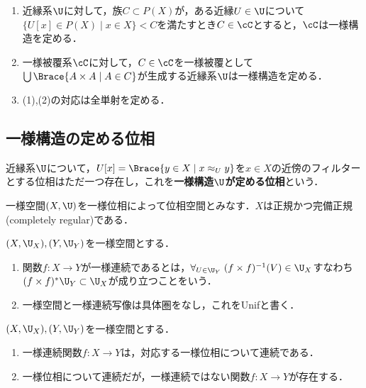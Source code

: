 \documentclass[uplatex,dvipdfmx]{jsreport}
\begin{document}
\begin{lemma}[２つの定義の同値性]\mbox{}
    \begin{enumerate}
        \item 近縁系$\U$に対して，族$C\subset P(X)$が，ある近縁$U\in\U$について$\{U[x]\in P(X)\mid x\in X\}<C$を満たすとき$C\in\cC$とすると，$\cC$は一様構造を定める．
        \item 一様被覆系$\cC$に対して，$C\in\cC$を一様被覆として$\bigcup\Brace{A\times A\mid A\in C}$が生成する近縁系$\U$は一様構造を定める．
        \item (1),(2)の対応は全単射を定める．
    \end{enumerate}
\end{lemma}

\subsection{一様構造の定める位相}


\begin{definition}
    近縁系$\U$について，$U[x]=\Brace{y\in X\mid x\approx_Uy}$を$x\in X$の近傍のフィルターとする位相はただ一つ存在し，これを\textbf{一様構造$\U$が定める位相}という．
\end{definition}

\begin{proposition}
    一様空間$(X,\U)$を一様位相によって位相空間とみなす．$X$は正規かつ完備正規(completely regular)である．
\end{proposition}

\begin{definition}
    $(X,\U_X),(Y,\U_Y)$を一様空間とする．
    \begin{enumerate}
        \item 関数$f:X\to Y$が一様連続であるとは，$\forall_{U\in\U_Y}\;(f\times f)^{-1}(V)\in\U_X$すなわち$(f\times f)^*\U_Y\subset\U_X$が成り立つことをいう．
        \item 一様空間と一様連続写像は具体圏をなし，これをUnifと書く．
    \end{enumerate}
\end{definition}

\begin{lemma}
    $(X,\U_X),(Y,\U_Y)$を一様空間とする．
    \begin{enumerate}
        \item 一様連続関数$f:X\to Y$は，対応する一様位相について連続である．
        \item 一様位相について連続だが，一様連続ではない関数$f:X\to Y$が存在する．
    \end{enumerate}
\end{lemma}
\end{document}
